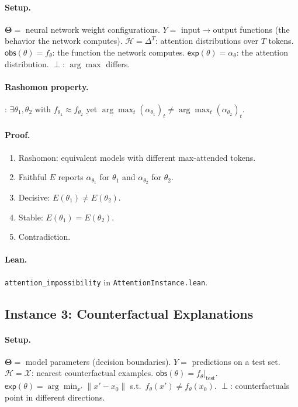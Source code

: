 \documentclass[11pt,a4paper]{article}
\newcommand{\Params}{\mathbf{\Theta}}
\newcommand{\sH}{\mathcal{H}}
\newcommand{\incomp}{\perp}
\begin{document}
\paragraph{Setup.}
$\Params ={}$ neural network weight configurations.
$Y ={}$ input$\to$output functions (the behavior the network computes).
$\sH = \Delta^T$: attention distributions over $T$ tokens.
$\mathsf{obs}(\theta) = f_\theta$: the function the network computes.
$\mathsf{exp}(\theta) = \alpha_\theta$: the attention distribution.
$\incomp$: $\arg\max$ differs.

\paragraph{Rashomon property.}
\citet{damour2022underspecification}: $\exists \theta_1, \theta_2$ with
$f_{\theta_1} \approx f_{\theta_2}$ yet
$\arg\max_t (\alpha_{\theta_1})_t \neq \arg\max_t (\alpha_{\theta_2})_t$.

\paragraph{Proof.}
\begin{enumerate}[nosep]
  \item Rashomon: equivalent models with different max-attended tokens.
  \item Faithful $E$ reports $\alpha_{\theta_1}$ for $\theta_1$ and
    $\alpha_{\theta_2}$ for $\theta_2$.
  \item Decisive: $E(\theta_1) \neq E(\theta_2)$.
  \item Stable: $E(\theta_1) = E(\theta_2)$.
  \item Contradiction.
\end{enumerate}

\paragraph{Lean.}
\texttt{attention\_impossibility} in \texttt{AttentionInstance.lean}.

\subsection{Instance 3: Counterfactual Explanations}
\label{app:proof-counterfactual}

\paragraph{Setup.}
$\Params ={}$ model parameters (decision boundaries).
$Y ={}$ predictions on a test set.
$\sH = \mathcal{X}$: nearest counterfactual examples.
$\mathsf{obs}(\theta) = f_\theta|_{\mathrm{test}}$.
$\mathsf{exp}(\theta) = \arg\min_{x'} \|x' - x_0\|$ s.t.\ $f_\theta(x') \neq f_\theta(x_0)$.
$\incomp$: counterfactuals point in different directions.
\end{document}

